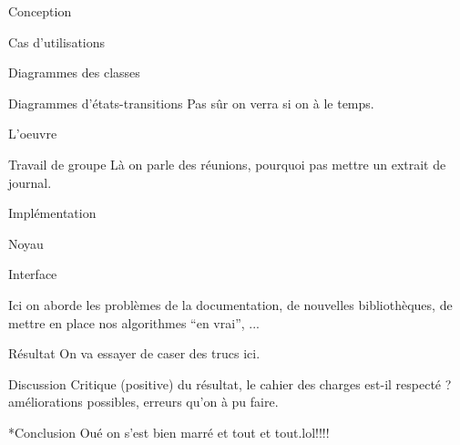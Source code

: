 \documentclass[a4paper, 12pt]{report}
\begin{document}
\begin{part}{Conception}
\begin{chapter}{Cas d'utilisations}
		\end{chapter}
		\begin{chapter}{Diagrammes des classes}
		
		\end{chapter}
		\begin{chapter}{Diagrammes d'états-transitions}
			Pas sûr on verra si on à le temps.
		\end{chapter}
	\end{part}
	\begin{part}{L'oeuvre}
		\begin{chapter}{Travail de groupe}
			Là on parle des réunions, pourquoi pas mettre un extrait de journal.
		\end{chapter}
		\begin{chapter}{Implémentation}
			\begin{section}{Noyau}
			\end{section}
			\begin{section}{Interface}
			\end{section}
			Ici on aborde les problèmes de la documentation, de nouvelles bibliothèques, de mettre en place nos algorithmes ``en vrai'', ... 
		\end{chapter}
		\begin{chapter}{Résultat}
			On va essayer de caser des trucs ici.
		\end{chapter}
		\begin{chapter}{Discussion}
			Critique (positive) du résultat, le cahier des charges est-il respecté ? améliorations possibles, erreurs qu'on à pu faire.
		\end{chapter}
	\end{part}
	\begin{chapter}*{Conclusion}
		Oué on s'est bien marré et tout et tout.lol!!!!
	\end{chapter}
	\renewcommand\glossaryname{Glossaire}
	\printglossaries
	\listoffigures
	\renewcommand\bibname{Sitographie}%
\end{document}
